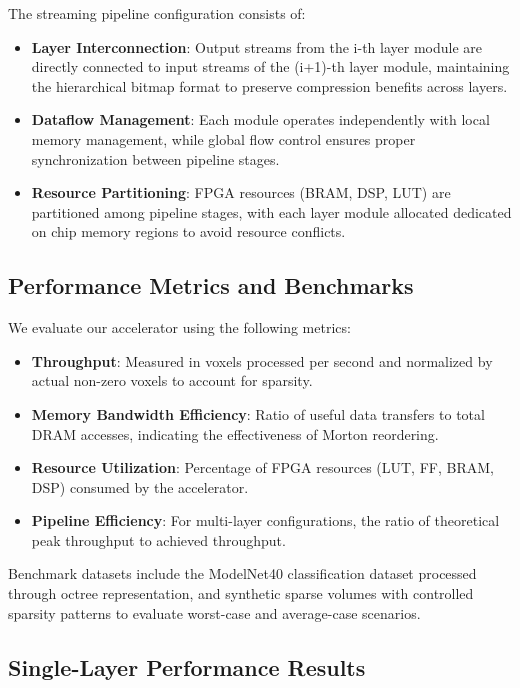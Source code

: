 \documentclass[sigconf, screen]{acmart}
\begin{document}
The streaming pipeline configuration consists of:
\begin{itemize}
  \item \textbf{Layer Interconnection}: Output streams from the i-th layer module are directly connected to input streams of the (i+1)-th layer module, maintaining the hierarchical bitmap format to preserve compression benefits across layers.
  \item \textbf{Dataflow Management}: Each module operates independently with local memory management, while global flow control ensures proper synchronization between pipeline stages.
  \item \textbf{Resource Partitioning}: FPGA resources (BRAM, DSP, LUT) are partitioned among pipeline stages, with each layer module allocated dedicated on chip memory regions to avoid resource conflicts.
\end{itemize}

\subsection{Performance Metrics and Benchmarks}

We evaluate our accelerator using the following metrics:
\begin{itemize}
  \item \textbf{Throughput}: Measured in voxels processed per second and normalized by actual non-zero voxels to account for sparsity.
  \item \textbf{Memory Bandwidth Efficiency}: Ratio of useful data transfers to total DRAM accesses, indicating the effectiveness of Morton reordering.
  \item \textbf{Resource Utilization}: Percentage of FPGA resources (LUT, FF, BRAM, DSP) consumed by the accelerator.
  \item \textbf{Pipeline Efficiency}: For multi-layer configurations, the ratio of theoretical peak throughput to achieved throughput.
\end{itemize}

Benchmark datasets include the ModelNet40 classification dataset processed through octree representation, and synthetic sparse volumes with controlled sparsity patterns to evaluate worst-case and average-case scenarios.

\subsection{Single-Layer Performance Results}
\end{document}
